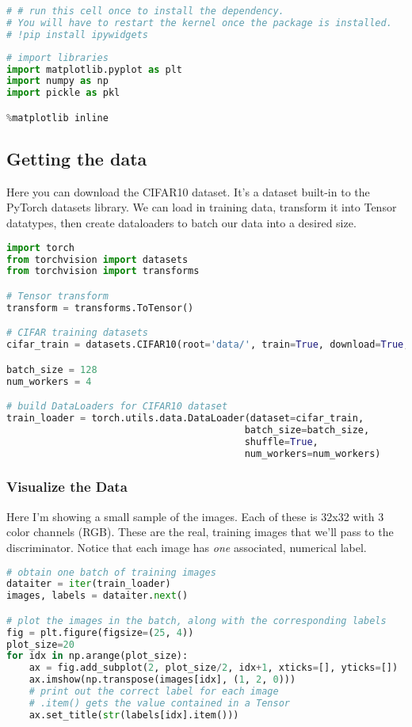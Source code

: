 \begin{lstlisting}[language=Python]
# # run this cell once to install the dependency. 
# You will have to restart the kernel once the package is installed.
# !pip install ipywidgets
\end{lstlisting}

\begin{lstlisting}[language=Python]
# import libraries
import matplotlib.pyplot as plt
import numpy as np
import pickle as pkl

%matplotlib inline
\end{lstlisting}

\subsection{Getting the data}

Here you can download the CIFAR10 dataset. It's a dataset built-in to
the PyTorch datasets library. We can load in training data, transform it
into Tensor datatypes, then create dataloaders to batch our data into a
desired size.

\begin{lstlisting}[language=Python]
import torch
from torchvision import datasets
from torchvision import transforms

# Tensor transform
transform = transforms.ToTensor()

# CIFAR training datasets
cifar_train = datasets.CIFAR10(root='data/', train=True, download=True, transform=transform)

batch_size = 128
num_workers = 4

# build DataLoaders for CIFAR10 dataset
train_loader = torch.utils.data.DataLoader(dataset=cifar_train,
                                          batch_size=batch_size,
                                          shuffle=True,
                                          num_workers=num_workers)
\end{lstlisting}

\subsubsection{Visualize the Data}

Here I'm showing a small sample of the images. Each of these is 32x32
with 3 color channels (RGB). These are the real, training images that
we'll pass to the discriminator. Notice that each image has \emph{one}
associated, numerical label.

\begin{lstlisting}[language=Python]
# obtain one batch of training images
dataiter = iter(train_loader)
images, labels = dataiter.next()

# plot the images in the batch, along with the corresponding labels
fig = plt.figure(figsize=(25, 4))
plot_size=20
for idx in np.arange(plot_size):
    ax = fig.add_subplot(2, plot_size/2, idx+1, xticks=[], yticks=[])
    ax.imshow(np.transpose(images[idx], (1, 2, 0)))
    # print out the correct label for each image
    # .item() gets the value contained in a Tensor
    ax.set_title(str(labels[idx].item()))
\end{lstlisting}

